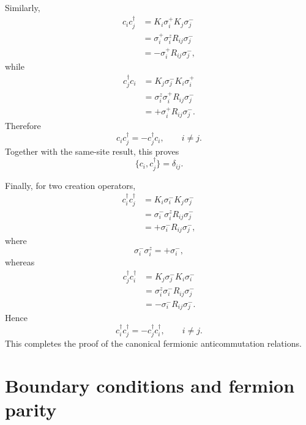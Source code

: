 Similarly,
\begin{align}
    c_i c_j^\dagger
    &=
    K_i\sigma_i^+K_j\sigma_j^-
    \nonumber\\
    &=
    \sigma_i^+\sigma_i^zR_{ij}\sigma_j^-
    \nonumber\\
    &=
    -\sigma_i^+R_{ij}\sigma_j^-,
\end{align}
while
\begin{align}
    c_j^\dagger c_i
    &=
    K_j\sigma_j^-K_i\sigma_i^+
    \nonumber\\
    &=
    \sigma_i^z\sigma_i^+R_{ij}\sigma_j^-
    \nonumber\\
    &=
    +\sigma_i^+R_{ij}\sigma_j^-.
\end{align}
Therefore
\begin{equation}
    c_ic_j^\dagger=-c_j^\dagger c_i,
    \qquad i\neq j.
\end{equation}
Together with the same-site result, this proves
\begin{equation}
    \{c_i,c_j^\dagger\}=\delta_{ij}.
\end{equation}

Finally, for two creation operators,
\begin{align}
    c_i^\dagger c_j^\dagger
    &=
    K_i\sigma_i^-K_j\sigma_j^-
    \nonumber\\
    &=
    \sigma_i^-\sigma_i^zR_{ij}\sigma_j^-
    \nonumber\\
    &=
    +\sigma_i^-R_{ij}\sigma_j^-,
\end{align}
where
\begin{equation}
    \sigma_i^-\sigma_i^z=+\sigma_i^-,
\end{equation}
whereas
\begin{align}
    c_j^\dagger c_i^\dagger
    &=
    K_j\sigma_j^-K_i\sigma_i^-
    \nonumber\\
    &=
    \sigma_i^z\sigma_i^-R_{ij}\sigma_j^-
    \nonumber\\
    &=
    -\sigma_i^-R_{ij}\sigma_j^-.
\end{align}
Hence
\begin{equation}
    c_i^\dagger c_j^\dagger=-c_j^\dagger c_i^\dagger,
    \qquad i\neq j.
\end{equation}
This completes the proof of the canonical fermionic anticommutation relations.

\section{Boundary conditions and fermion parity}

